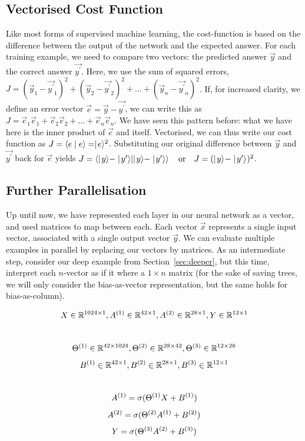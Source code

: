 \subsection{Vectorised Cost Function}
Like most forms of supervised machine learning, the cost-function is based on the difference between the output of the network and the expected answer. For each training example, we need to compare two vectors: the predicted answer $\vec y$ and the correct answer $\vec{y^\prime}$. Here, we use the sum of squared errors, $J = (\vec{y}_{1} - \vec{y^\prime}_{1})^2 + (\vec{y}_{2} - \vec{y^\prime}_{2})^2 + \dots + (\vec{y}_{n} - \vec{y^\prime}_{n})^2$. If, for increased clarity, we define an error vector $\vec e = \vec y - \vec {y^\prime}$, we can write this as $J = \vec e_1\vec e_1+\vec e_2\vec e_2 + \dots + \vec e_n \vec e_n$. We have seen this pattern before: what we have here is the inner product of $\vec{e}$ and itself. Vectorised, we can thus write our cost function as $J = \langle e \mid e \rangle = \mid\! e\rangle^2$. Substituting our original difference between $\vec y$ and $\vec {y^\prime}$ back for $\vec e$ yields $J = \bra{\mid\! y\rangle-\mid\! y^\prime\rangle}\ket{\mid\! y\rangle-\mid\! y^\prime\rangle} \quad \text{or} \quad J = (\mid\! y\rangle_{} - \mid\! y^\prime\rangle_{})^2$.

\subsection{Further Parallelisation}
  Up until now, we have represented each layer in our neural network as a vector, and used matrices to map between each. Each vector $\vec x$ represents a single input vector, associated with a single output vector $\vec y$. We can evaluate multiple examples in parallel by replacing our vectors by matrices. As an intermediate step, consider our deep example from Section~\ref{sec:deeper}, but this time, interpret each $n$-vector as if it where a $1 \times n$ matrix (for the sake of saving trees, we will only consider the bias-as-vector representation, but the same holds for bias-as-column).

  $$X \in \mathbb{R}^{1024\times 1}, A^{(1)} \in \mathbb{R}^{42\times 1}, A^{(2)} \in \mathbb{R}^{28\times 1}, Y \in \mathbb{R}^{12\times 1}$$\\[-3mm]
  $$\Theta^{(1)} \in \mathbb{R}^{42 \times 1024}, \Theta^{(2)} \in \mathbb{R}^{28 \times 42}, \Theta^{(3)} \in \mathbb{R}^{12 \times 28}$$
  $$B^{(1)} \in \mathbb{R}^{42 \times 1}, B^{(2)} \in \mathbb{R}^{28 \times 1}, B^{(3)} \in \mathbb{R}^{12 \times 1}$$\\[-2mm]
  $$A^{(1)} = \sigma(\Theta^{(1)}X+B^{(1)})$$
  $$A^{(2)} = \sigma(\Theta^{(2)}A^{(1)}+B^{(2)})$$
  $$Y = \sigma(\Theta^{(3)}A^{(2)}+B^{(3)})$$

